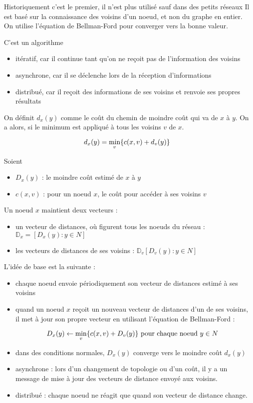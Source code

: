 	Historiquement c'est le premier, il n'est plus utilisé sauf dans des petits réseaux Il est basé sur la connaissance des voisins d'un noeud, et non du graphe en entier. On utilise l'équation de Bellman-Ford pour converger vers la bonne valeur.
	
	C'est un algorithme
	
	\begin{itemize}
		\item itératif, car il continue tant qu'on ne reçoit pas de l'information des voisins
		\item asynchrone, car il se déclenche lors de la réception d'informations
		\item distribué, car il reçoit des informations de ses voisins et renvoie ses propres résultats
	\end{itemize}
	
	On définit $d_x(y)$ comme le coût du chemin de moindre coût qui va de $x$ à $y$. On a alors, si le minimum est appliqué à tous les voisins $v$ de $x$.
	
	$$d_x(y) = \min_v \lbrace c(x, v) + d_v(y) \rbrace$$

	Soient
	
	\begin{itemize}
		\item $D_x(y)$ : le moindre coût estimé de $x$ à $y$
		\item $c(x,v)$ : pour un noeud $x$, le coût pour accéder à ses voisins $v$
	\end{itemize}
	
	Un noeud $x$ maintient deux vecteurs :
	
	\begin{itemize}
		\item un vecteur de distances, où figurent tous les noeuds du réseau : $ \mathbb{D}_x = [D_x(y) : y \in N] $
		\item les vecteurs de distances de ses voisins : $ \mathbb{D}_v [ D_v(y) : y \in N]$
	\end{itemize}
	
	L'idée de base est la suivante :
	
	\begin{itemize}
		\item chaque noeud envoie périodiquement son vecteur de distances estimé à ses voisins
		
		\item quand un noeud $x$ reçoit un nouveau vecteur de distances d'un de ses voisins, il met à jour son propre vecteur en utilisant l'équation de Bellman-Ford :
		
		$$D_x(y) \leftarrow \min_v \lbrace  c(x, v) + D_v(y) \rbrace \text{ pour chaque noeud } y \in N$$
		\item dans des conditions normales, $D_x(y)$ converge vers le moindre coût $d_x(y)$
		
		\item asynchrone : lors d'un changement de topologie ou d'un coût, il y a un message de mise à jour des vecteurs de distance envoyé aux voisins.
		
		\item distribué : chaque noeud ne réagit que quand son vecteur de distance change.
	\end{itemize}

